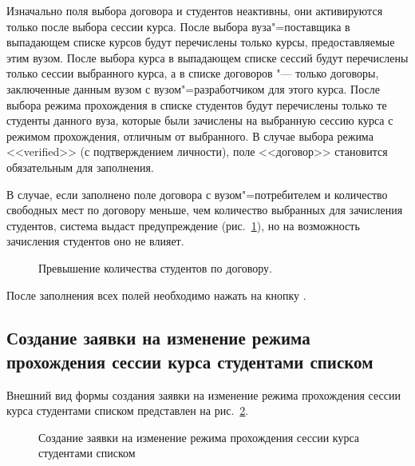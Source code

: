 Изначально поля выбора договора и студентов неактивны, они активируются только после выбора сессии курса.
После выбора вуза"=поставщика в выпадающем списке курсов будут перечислены только курсы, предоставляемые этим вузом.
После выбора курса в выпадающем списке сессий будут перечислены только сессии выбранного курса, 
а в списке договоров "--- только договоры, заключенные данным вузом с вузом"=разработчиком для этого курса.
После выбора режима прохождения в списке студентов будут перечислены только те студенты данного вуза, 
которые были зачислены на выбранную сессию курса с режимом прохождения, отличным от выбранного.
В случае выбора режима <<verified>> (с подтверждением личности), поле <<договор>> становится обязательным для заполнения. 


В случае, если заполнено поле договора с вузом"=потребителем и количество свободных мест по договору меньше, 
чем количество выбранных для зачисления студентов, система выдаст предупреждение 
(рис.~\ref{img:student:change_mode_req_create_student_error}), но на возможность зачисления студентов оно не влияет.

\begin{figure}[H]
	\caption{Превышение количества студентов по договору.}
	\label{img:student:change_mode_req_create_student_error}
\end{figure}

После заполнения всех полей необходимо нажать на кнопку .

\subsection{Создание заявки на изменение режима прохождения сессии курса студентами списком}
Внешний вид формы создания заявки на изменение режима прохождения сессии курса студентами списком 
представлен на рис.~\ref{img:student:mass_change_mode_req_create}.

\begin{figure}[H]
	\caption{Создание заявки на изменение режима прохождения сессии курса студентами списком}
	\label{img:student:mass_change_mode_req_create}
\end{figure}

